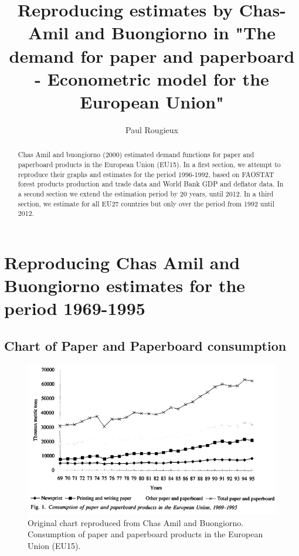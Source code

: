 \documentclass{scrartcl}\usepackage{graphicx, color}
\title{Reproducing estimates by Chas-Amil and Buongiorno in "The demand for paper and paperboard - Econometric model for the European Union"}
\author{Paul Rougieux}
\begin{document}
\maketitle

\begin{abstract}
Chas Amil and buongiorno (2000) estimated demand functions for paper and paperboard products in the European Union (EU15). In a first section, we attempt to reproduce their graphs and estimates for the period 1996-1992, based on FAOSTAT forest products production and trade data and World Bank GDP and deflator data. In a second section we extend the estimation period by 20 years, until 2012. In a third section, we estimate for all EU27 countries but only over the period from 1992 until 2012. 
\end{abstract}

\setcounter{tocdepth}{2}
\tableofcontents 






\newpage
\section{Reproducing Chas Amil and Buongiorno estimates for the period 1969-1995}
\subsection{Chart of Paper and Paperboard consumption}
\begin{figure}[h]
\centering
\includegraphics[width=0.7\linewidth]{./figure/ChasAmilConsumption}
\caption{Original chart reproduced from Chas Amil and Buongiorno. Consumption of paper and paperboard products in the European Union (EU15).}
\label{fig:ChasAmilConsumption}
\end{figure}
\end{document}
